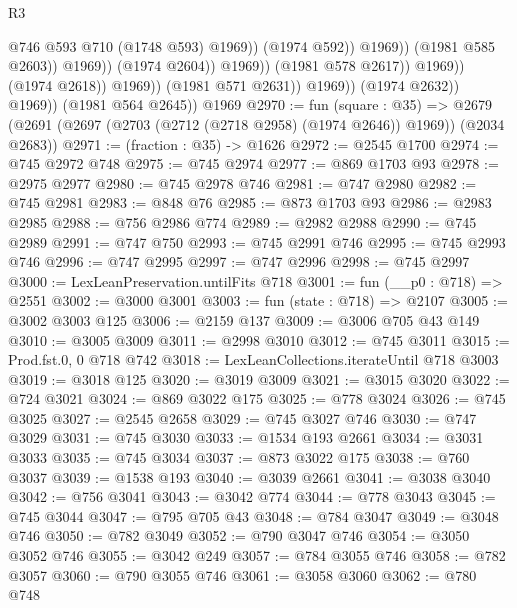 \begin{lexlean}{R3}
\begin{coremodule}
                                                    @746
                                                    @593
                                                    @710
                                                    (@1748 @593)
                                                    @1969))
                                                (@1974 @592))
                                              @1969))
                                          (@1981 @585 @2603))
                                        @1969))
                                    (@1974 @2604))
                                  @1969))
                              (@1981 @578 @2617))
                            @1969))
                        (@1974 @2618))
                      @1969))
                  (@1981 @571 @2631))
                @1969))
            (@1974 @2632))
          @1969))
      (@1981 @564 @2645))
    @1969
@2970 := fun (square : @35) =>
  @2679 (@2691 (@2697 (@2703 (@2712 (@2718 @2958) (@1974 @2646)) @1969)) (@2034 @2683))
@2971 := (fraction : @35) -> @1626
@2972 := @2545 @1700
@2974 := @745 @2972 @748
@2975 := @745 @2974
@2977 := @869 @1703 @93
@2978 := @2975 @2977
@2980 := @745 @2978 @746
@2981 := @747 @2980
@2982 := @745 @2981
@2983 := @848 @76
@2985 := @873 @1703 @93
@2986 := @2983 @2985
@2988 := @756 @2986 @774
@2989 := @2982 @2988
@2990 := @745 @2989
@2991 := @747 @750
@2993 := @745 @2991 @746
@2995 := @745 @2993 @746
@2996 := @747 @2995
@2997 := @747 @2996
@2998 := @745 @2997
@3000 := LexLeanPreservation.untilFits @718
@3001 := fun (__p0 : @718) => @2551
@3002 := @3000 @3001
@3003 := fun (state : @718) => @2107
@3005 := @3002 @3003 @125
@3006 := @2159 @137
@3009 := @3006 @705 @43 @149
@3010 := @3005 @3009
@3011 := @2998 @3010
@3012 := @745 @3011
@3015 := Prod.fst.{0, 0} @718 @742
@3018 := LexLeanCollections.iterateUntil @718 @3003
@3019 := @3018 @125
@3020 := @3019 @3009
@3021 := @3015 @3020
@3022 := @724 @3021
@3024 := @869 @3022 @175
@3025 := @778 @3024
@3026 := @745 @3025
@3027 := @2545 @2658
@3029 := @745 @3027 @746
@3030 := @747 @3029
@3031 := @745 @3030
@3033 := @1534 @193 @2661
@3034 := @3031 @3033
@3035 := @745 @3034
@3037 := @873 @3022 @175
@3038 := @760 @3037
@3039 := @1538 @193
@3040 := @3039 @2661
@3041 := @3038 @3040
@3042 := @756 @3041
@3043 := @3042 @774
@3044 := @778 @3043
@3045 := @745 @3044
@3047 := @795 @705 @43
@3048 := @784 @3047
@3049 := @3048 @746
@3050 := @782 @3049
@3052 := @790 @3047 @746
@3054 := @3050 @3052 @746
@3055 := @3042 @249
@3057 := @784 @3055 @746
@3058 := @782 @3057
@3060 := @790 @3055 @746
@3061 := @3058 @3060
@3062 := @780 @748

\end{coremodule}
\end{lexlean}
